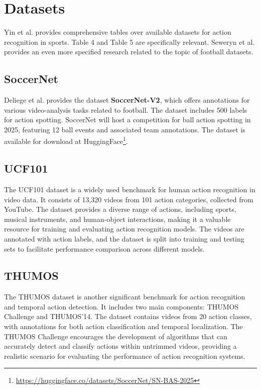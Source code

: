 \section{Datasets}
\label{sec:datasets}

Yin et al. \cite{survey_of_survey} provides comprehensive tables over available datasets for action recognition in sports. Table 4 and Table 5 are specifically relevant. Seweryn et al. \cite{seweryn_survey_2023} provides an even more specified research related to the topic of football datasets. 

\subsection{SoccerNet}

Deliege et al. \cite{deliege_soccernet-v2_dataset_2021} provides the dataset \textbf{SoccerNet-V2}, which offers annotations for various video-analysis tasks related to football. The dataset includes 500 labels for action spotting. SoccerNet will host a competition for ball action spotting in 2025, featuring 12 ball events and associated team annotations. The dataset is available for download at HuggingFace\footnote{\url{https://huggingface.co/datasets/SoccerNet/SN-BAS-2025}}.

\subsection{UCF101}

The UCF101 dataset \cite{dataset:UCF101} is a widely used benchmark for human action recognition in video data. It consists of 13,320 videos from 101 action categories, collected from YouTube. The dataset provides a diverse range of actions, including sports, musical instruments, and human-object interactions, making it a valuable resource for training and evaluating action recognition models. The videos are annotated with action labels, and the dataset is split into training and testing sets to facilitate performance comparison across different models.

\subsection{THUMOS}

The THUMOS dataset \cite{dataset:thumos} is another significant benchmark for action recognition and temporal action detection. It includes two main components: THUMOS Challenge and THUMOS'14. The dataset contains videos from 20 action classes, with annotations for both action classification and temporal localization. The THUMOS Challenge encourages the development of algorithms that can accurately detect and classify actions within untrimmed videos, providing a realistic scenario for evaluating the performance of action recognition systems.

